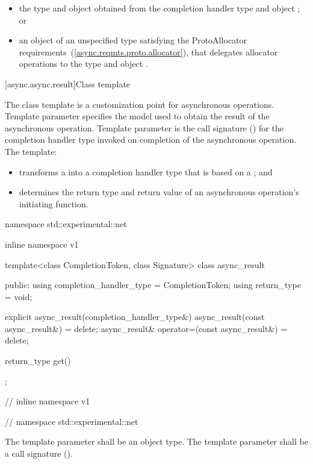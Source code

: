 \begin{itemize}
\item
the type  and object  obtained from the completion handler type  and object ; or

\item
an object of an unspecified type satisfying the ProtoAllocator requirements~(\ref{async.reqmts.proto.allocator}), that delegates allocator operations to the type  and object .
\end{itemize}



[async.async.result]{Class template }

%
\pnum
The  class template is a customization point for asynchronous operations. Template parameter  specifies the model used to obtain the result of the asynchronous operation. Template parameter  is the call signature () for the completion handler type invoked on completion of the asynchronous operation. The  template:

\begin{itemize}
\item
transforms a  into a completion handler type that is based on a ; and

\item
determines the return type and return value of an asynchronous operation's initiating function.
\end{itemize}

\begin{codeblock}
namespace std::experimental::net {
inline namespace v1 {

  template<class CompletionToken, class Signature>
  class async_result
  {
  public:
    using completion_handler_type = CompletionToken;
    using return_type = void;

    explicit async_result(completion_handler_type&) {}
    async_result(const async_result&) = delete;
    async_result& operator=(const async_result&) = delete;

    return_type get() {}
  };

} // inline namespace v1
} // namespace std::experimental::net
\end{codeblock}

\pnum
The template parameter  shall be an object type. The template parameter  shall be a call signature ().

